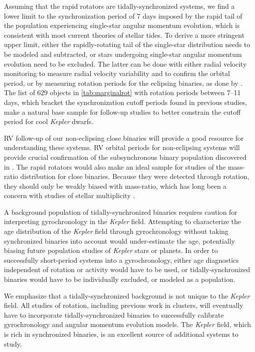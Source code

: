 \documentclass[twocolumn]{aastex6}
\newcommand{\Kepler}{\mbox{\textit{Kepler}}}
\begin{document}
Assuming that the rapid rotators are tidally-synchronized systems, we find a
lower limit to the synchronization period of 7 days imposed by the rapid tail
of the population experiencing single-star angular momentum evolution, which is
consistent with most current theories of stellar tides. To derive a more
stringent upper limit, either the rapidly-rotating tail of the single-star
distribution needs to be modeled and subtracted, or stars undergoing 
single-star angular momentum evolution need to be excluded. The latter can be
done with either radial velocity monitoring to measure radial velocity
variability and to confirm the orbital period, or by measuring rotation periods
for the eclipsing binaries, as done by \citet{Lurie17}. The list of 629
objects in \cref{tab:marginalrot} with rotation periods between 7--11 days, 
which bracket the synchronization cutoff periods found in previous studies,
make a natural base sample for follow-up studies to better constrain the 
cutoff period for cool \Kepler{} dwarfs.

RV follow-up of our non-eclipsing close binaries will provide a good resource
for understanding these systems. RV orbital periods for non-eclipsing systems 
will provide crucial confirmation of the subsynchronous binary population 
discovered in \citet{Lurie17}. The rapid rotators would also make an ideal 
sample for studies of the mass-ratio distribution for close binaries. Because 
they were detected through rotation, they should only be weakly biased with 
mass-ratio, which has long been a concern with studies of stellar multiplicity
\citep{Halbwachs03}.

A background population of tidally-synchronized binaries requires caution for
interpreting gyrochronology in the \Kepler{} field. Attempting to characterize
the age distribution of the \Kepler{} field through gyrochronology without 
taking synchronized binaries into account would under-estimate the age, 
potentially biasing future population studies of \Kepler{} stars or planets. 
In order to successfully short-period systems into a gyrochronology, either 
age diagnostics independent of rotation or activity would have to be used, or
tidally-synchronized binaries would have to be individually excluded, or
modeled as a population.

We emphasize that a tidally-synchronized background is not unique to the
\Kepler{} field. All studies of rotation, including previous work in clusters,
will eventually have to incorporate tidally-synchronized binaries to
successfully calibrate gyrochronology and angular momentum evolution models.
The \Kepler{} field, which is rich in synchronized binaries, is an excellent 
source of additional systems to study.
\end{document}
